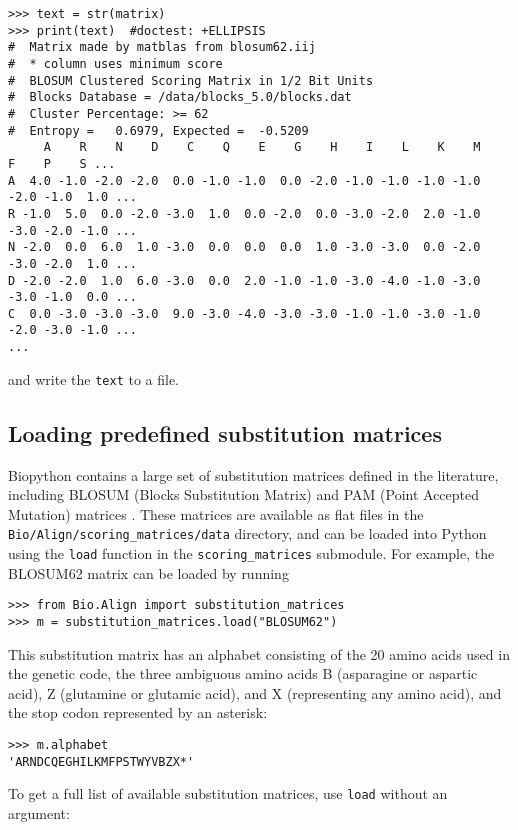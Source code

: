\begin{verbatim}
>>> text = str(matrix)
>>> print(text)  #doctest: +ELLIPSIS
#  Matrix made by matblas from blosum62.iij
#  * column uses minimum score
#  BLOSUM Clustered Scoring Matrix in 1/2 Bit Units
#  Blocks Database = /data/blocks_5.0/blocks.dat
#  Cluster Percentage: >= 62
#  Entropy =   0.6979, Expected =  -0.5209
     A    R    N    D    C    Q    E    G    H    I    L    K    M    F    P    S ...
A  4.0 -1.0 -2.0 -2.0  0.0 -1.0 -1.0  0.0 -2.0 -1.0 -1.0 -1.0 -1.0 -2.0 -1.0  1.0 ...
R -1.0  5.0  0.0 -2.0 -3.0  1.0  0.0 -2.0  0.0 -3.0 -2.0  2.0 -1.0 -3.0 -2.0 -1.0 ...
N -2.0  0.0  6.0  1.0 -3.0  0.0  0.0  0.0  1.0 -3.0 -3.0  0.0 -2.0 -3.0 -2.0  1.0 ...
D -2.0 -2.0  1.0  6.0 -3.0  0.0  2.0 -1.0 -1.0 -3.0 -4.0 -1.0 -3.0 -3.0 -1.0  0.0 ...
C  0.0 -3.0 -3.0 -3.0  9.0 -3.0 -4.0 -3.0 -3.0 -1.0 -1.0 -3.0 -1.0 -2.0 -3.0 -1.0 ...
...
\end{verbatim}
and write the \verb+text+ to a file.

\subsection*{Loading predefined substitution matrices}

Biopython contains a large set of substitution matrices defined in the literature, including BLOSUM (Blocks Substitution Matrix) \cite{henikoff1992} and PAM (Point Accepted Mutation) matrices \cite{dayhoff1978}. These matrices are available as flat files in the \verb+Bio/Align/scoring_matrices/data+ directory, and can be loaded into Python using the \verb+load+ function in the \verb+scoring_matrices+ submodule. For example, the BLOSUM62 matrix can be loaded by running

\begin{verbatim}
>>> from Bio.Align import substitution_matrices
>>> m = substitution_matrices.load("BLOSUM62")
\end{verbatim}
This substitution matrix has an alphabet consisting of the 20 amino acids used in the genetic code, the three ambiguous amino acids B (asparagine or aspartic acid), Z (glutamine or glutamic acid), and X (representing any amino acid), and the stop codon represented by an asterisk:

\begin{verbatim}
>>> m.alphabet
'ARNDCQEGHILKMFPSTWYVBZX*'
\end{verbatim}

To get a full list of available substitution matrices, use \verb+load+ without an argument:

